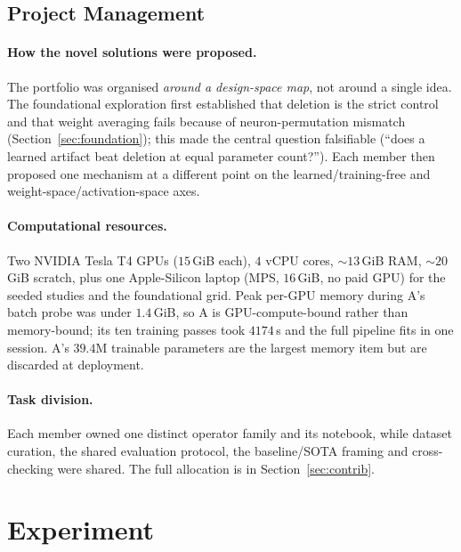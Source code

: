 \documentclass[10pt,a4paper]{article}
\begin{document}
\subsection{Project Management}
\label{sec:management}

\paragraph{How the novel solutions were proposed.} The portfolio was organised
\emph{around a design-space map}, not around a single idea. The foundational
exploration first established that deletion is the strict control and that
weight averaging fails because of neuron-permutation mismatch
(Section~\ref{sec:foundation}); this made the central question falsifiable
(``does a learned artifact beat deletion at equal parameter count?''). Each
member then proposed one mechanism at a different point on the
learned/training-free and weight-space/activation-space axes.

\paragraph{Computational resources.} Two NVIDIA Tesla T4 GPUs ($15$\,GiB each),
$4$ vCPU cores, ${\sim}13$\,GiB RAM, ${\sim}20$\,GiB scratch, plus one
Apple-Silicon laptop (MPS, $16$\,GiB, no paid GPU) for the seeded studies and
the foundational grid. Peak per-GPU memory during A's batch probe was under
$1.4$\,GiB, so A is GPU-compute-bound rather than memory-bound; its ten training
passes took $4174$\,s and the full pipeline fits in one session. A's $39.4$M
trainable parameters are the largest memory item but are discarded at deployment.

\paragraph{Task division.} Each member owned one distinct operator family and its
notebook, while dataset curation, the shared evaluation protocol, the
baseline/SOTA framing and cross-checking were shared. The full allocation is in
Section~\ref{sec:contrib}.

\section{Experiment}
\end{document}
